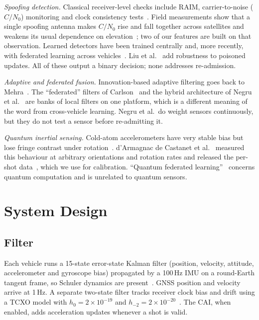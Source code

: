 \documentclass[conference]{IEEEtran}
\begin{document}
\textit{Spoofing detection.} Classical receiver-level checks include RAIM, carrier-to-noise ($C/N_0$) monitoring and clock consistency tests~\cite{psiaki2016gnss,rados2024recent}. Field measurements show that a single spoofing antenna makes $C/N_0$ rise and fall together across satellites and weakens its usual dependence on elevation~\cite{rados2024recent}; two of our features are built on that observation. Learned detectors have been trained centrally and, more recently, with federated learning across vehicles~\cite{khan2025enhancing,chai2025navigation}. Liu et al.~\cite{liu2026g2fl} add robustness to poisoned updates. All of these output a binary decision; none addresses re-admission.

\textit{Adaptive and federated fusion.} Innovation-based adaptive filtering goes back to Mehra~\cite{mehra1970identification}. The ``federated'' filters of Carlson~\cite{carlson1988federated,carlson1990federated} and the hybrid architecture of Negru et al.~\cite{negru2024resilient} are banks of local filters on one platform, which is a different meaning of the word from cross-vehicle learning. Negru et al.\ do weight sensors continuously, but they do not test a sensor before re-admitting it.

\textit{Quantum inertial sensing.} Cold-atom accelerometers have very stable bias but lose fringe contrast under rotation~\cite{cheiney2018navigation,templier2022tracking}. d'Armagnac de Castanet et al.~\cite{darmagnac2024atom} measured this behaviour at arbitrary orientations and rotation rates and released the per-shot data~\cite{darmagnac2024dataset}, which we use for calibration. ``Quantum federated learning''~\cite{hazarika2025quantum,chehimi2023foundations} concerns quantum computation and is unrelated to quantum sensors.

\section{System Design}

\subsection{Filter}
Each vehicle runs a 15-state error-state Kalman filter (position, velocity, attitude, accelerometer and gyroscope bias) propagated by a 100\,Hz IMU on a round-Earth tangent frame, so Schuler dynamics are present~\cite{sola2017quaternion}. GNSS position and velocity arrive at 1\,Hz. A separate two-state filter tracks receiver clock bias and drift using a TCXO model with $h_0=2\times10^{-19}$ and $h_{-2}=2\times10^{-20}$~\cite{brown2012introduction}. The CAI, when enabled, adds acceleration updates whenever a shot is valid.
\end{document}
